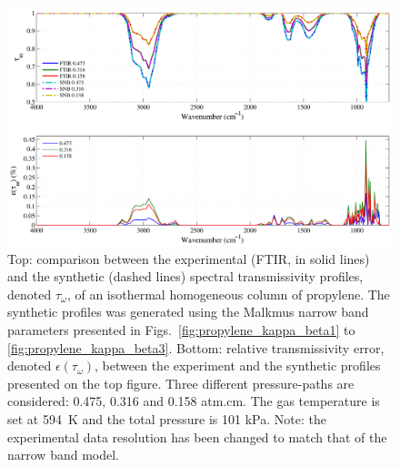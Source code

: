 \begin{figure}[p]
\includegraphics[width=\textwidth]{Figures/Comparison_Fit_Propylene_MALKMUS_Temp594K.pdf}
\caption{Top: comparison between the experimental (FTIR, in solid lines) and the synthetic (dashed lines) spectral transmissivity profiles, denoted $\tau_{\omega}$, of an isothermal homogeneous column of propylene. The synthetic profiles was generated using the Malkmus narrow band parameters presented in Figs.~\ref{fig:propylene_kappa_beta1} to \ref{fig:propylene_kappa_beta3}. Bottom: relative transmissivity error, denoted $\epsilon{(\tau_{\omega})}$, between the experiment and the synthetic profiles presented on the top figure. Three different pressure-paths are considered: 0.475, 0.316 and 0.158 atm.cm. The gas temperature is set at 594~K and the total pressure is 101 kPa. Note: the experimental data resolution has been changed to match that of the narrow band model. \label{fig:propylene_SNBVerify_594K}}
\end{figure}

